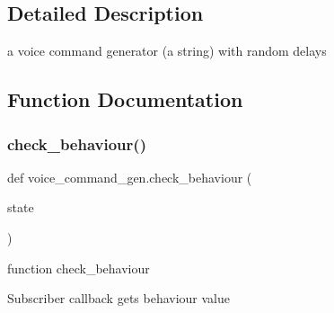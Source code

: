 \subsection{Detailed Description}
a voice command generator (a string) with random delays 

\subsection{Function Documentation}
\mbox{\label{namespacevoice__command__gen_ae128380f6ff2c307c824c4a7e612ac22}} 
\subsubsection{\texorpdfstring{check\+\_\+behaviour()}{check\_behaviour()}}
{\footnotesize\ttfamily def voice\+\_\+command\+\_\+gen.\+check\+\_\+behaviour (\begin{DoxyParamCaption}\item[{}]{state }\end{DoxyParamCaption})}



function check\+\_\+behaviour 

Subscriber callback gets behaviour value 